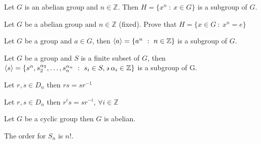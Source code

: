 \begin{assignment}[
  header=HeaderA,
  body=BodyA,
  title={Proved Proposition (Examples) in  Group Theory},
  duedate={\today},
  toc=false,
  toctitle={This appears on the Table of contents.},
  exlist=false
]



\begin{mprop}[3][][prop:3]
Let $G$ is an abelian group and $n \in \mathbb{Z}$. Then $H = \{ x^n \ : \ x \in G\}$ is a subgroup of $G$.
\end{mprop}

\begin{mprop}[4][][prop:4]
Let $G$ be a abelian group and $n \in \mathbb{Z}$ (fixed). Prove that $H = \{ x \in G \ : \ x^n = e\}$
\end{mprop}

\begin{mprop}[5][][prop:5]
Let $G$ be a group and $a \in G$, then $\langle a \rangle = \{ a^n \ : \ n \in \mathbb{Z} \}$ is a subgroup of $G$.
\end{mprop}


\begin{mprop}[6][][prop:6]
Let $G$ be a group and $S$ is a finite subset of $G$, then\\ $\langle s \rangle = \{s^{\alpha}, s_2^{\alpha_2}, \ldots,s_n^{\alpha_n} \ : \ s_i \in S, \backepsilon \alpha_i \in \mathbb{Z}\}$ is a subgroup of G. 
\end{mprop}


\begin{mprop}[7][][prop:7]
Let $r,s \in D_n$ then $rs = sr^{-1}$
\end{mprop}


\begin{mprop}
Let $r,s \in D_n$ then $r^is = sr^{-i}$, $\forall i \in \mathbb{Z}$
\end{mprop}

\begin{mprop}[9][][prop:9]
Let $G$ be a cyclic group then $G$ is abelian.
\end{mprop}

\begin{mprop}[13][][prop:13]
The order for $S_n$ is $n!$.
\end{mprop}


\end{assignment}
